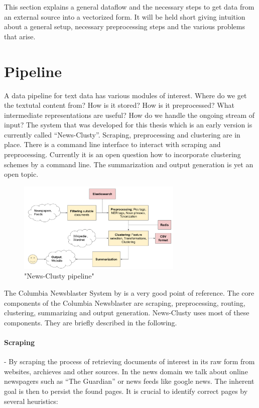 
This section explains a general dataflow and the necessary steps to get data from an external source into a vectorized form. It will be held short giving intuition about a general setup, necessary preprocessing steps and the various problems that arise.

\section{Pipeline}
  A data pipeline for text data has various modules of interest. Where do we get the textutal content from? How is it stored? How is it preprocessed? What intermediate representations are useful? How do we handle the ongoing stream of input? The system that was developed for this thesis which is an early version is currently called ``News-Clusty''. Scraping, preprocessing and clustering are in place. There is a command line interface to interact with scraping and preprocessing. Currently it is an open question how to incorporate clustering schemes by a command line. The summarization and output generation is yet an open topic.

  \begin{figure}[h!]
    \centering
      \includegraphics[width=0.7\textwidth]{news_clusty.png}
      \caption{"News-Clusty pipeline"}
      \label{news_clusty}
  \end{figure}

  The Columbia Newsblaster System by \cite{ColumbiaMultiDoc2001} is a very good point of reference. The core components of the Columbia Newsblaster are scraping, preprocessing, routing, clustering, summarizing and output generation. News-Clusty uses most of these components. They are briefly described in the following.

  \paragraph{Scraping} - By scraping the process of retrieving documents of interest in its raw form from websites, archieves and other sources. In the news domain we talk about online newspagers such as ``The Guardian'' or news feeds like google news. The inherent goal is then to persist the found pages. It is crucial to identify correct pages by several heuristics:

